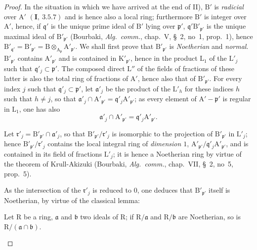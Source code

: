 \begin{proof}
In the situation in which we have arrived at the end of II),
$\mathrm{B}'$ is \emph{radicial} over $\mathrm{A}'$ $(\mathbf{I},~3.5.7)$ and is hence also a local ring; furthermore $\mathrm{B}'$ is
integer over $\mathrm{A}'$, hence, if $\mathfrak{q}'$ is the unique prime ideal of $\mathrm{B}'$ lying over $\mathfrak{p}'$, $\mathfrak{q}'\mathrm{B}'_{\mathfrak{p}'}$ is the unique
maximal ideal of $\mathrm{B}'_{\mathfrak{p}'}$ (Bourbaki, \emph{Alg.~comm.}, chap.~V, \S~2, no~1, prop.~1), hence
$\mathrm{B}'_{\mathfrak{q}'}=\mathrm{B}'_{\mathfrak{p}'}=\mathrm{B}\otimes_{\mathrm{A}_\mathfrak{p}}\mathrm{A}'_{\mathfrak{p}'}$. We shall first prove that $\mathrm{B}'_{\mathfrak{p}'}$ is \emph{Noetherian}
and \emph{normal}. $\mathrm{B}'_{\mathfrak{p}'}$ contains $\mathrm{A}'_{\mathfrak{p}'}$ and is contained in $\mathrm{K}'_{\mathfrak{p}'}$, hence in the product $\mathrm{L}_1$ of the $\mathrm{L}'_j$ such that $\mathfrak{q}'_j\subset\mathfrak{p}'$. The composed
direct $\mathrm{L}''$ of the fields of fractions of these latter is also the total ring of fractions of $\mathrm{A}'$,
hence also that of $\mathrm{B}'_{\mathfrak{p}'}$. For every index $j$ such that $\mathfrak{q}'_j\subset\mathfrak{p}'$, let $\mathfrak{a}'_j$ be the product of the $\mathrm{L}'_h$ for these indices $h$ such that $h\neq j$, so that
$\mathfrak{a}'_j\cap\mathrm{A}'_{\mathfrak{p}'}=\mathfrak{q}'_j\mathrm{A}'_{\mathfrak{p}'}$; as every element of $\mathrm{A}'-\mathfrak{p}'$ is regular in $\mathrm{L}_1$, one has also
\[
  \mathfrak{a}'_j\cap\mathrm{A}'_{\mathfrak{p}'}=\mathfrak{q}'_j\mathrm{A}'_{\mathfrak{p}'}.
\]

Let $\mathfrak{r}'_j=\mathrm{B}'_{\mathfrak{p}'}\cap\mathfrak{a}'_j$, so that $\mathrm{B}'_{\mathfrak{p}'}/\mathfrak{r}'_j$ is isomorphic to the projection of $\mathrm{B}'_{\mathfrak{p}'}$ in $\mathrm{L}'_j$;
hence $\mathrm{B}'_{\mathfrak{p}'}/\mathfrak{r}'_j$ contains the local integral ring of \emph{dimension $1$}, $\mathrm{A}'_{\mathfrak{p}'}/\mathfrak{q}'_j\mathrm{A}'_{\mathfrak{p}'}$, and is contained
in its field of fractions $\mathrm{L}'_j$; it is hence a Noetherian ring by virtue of the theorem of
Krull-Akizuki (Bourbaki, \emph{Alg.~comm.}, chap.~VII, \S~2, no~5, prop.~5).


As the intersection of the $\mathfrak{r}'_j$ is reduced to $0$, one deduces that $\mathrm{B}'_{\mathfrak{p}'}$ itself is
Noetherian, by virtue of the classical lemma:

\begin{lemma}[6.14.1.4]
\label{IV.6.14.1.4}
Let $\mathrm{R}$ be a ring, $\mathfrak{a}$ and $\mathfrak{b}$ two ideals of $\mathrm{R}$; if $\mathrm{R}/\mathfrak{a}$ and $\mathrm{R}/\mathfrak{b}$
are Noetherian, so is $\mathrm{R}/(\mathfrak{a}\cap\mathfrak{b})$.
\end{lemma}


\end{proof}

